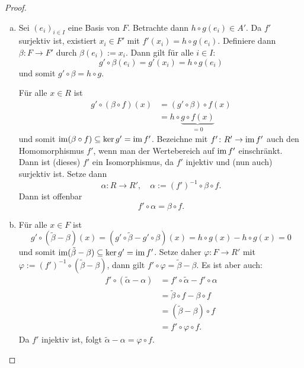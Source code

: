 \begin{proof}
  \begin{enumerate}[(a)]
    \item
      Sei ${(e_i)}_{i \in I}$ eine Basis von $F$.
      Betrachte dann $h \circ g (e_i) \in A'$.
      Da $f'$ surjektiv ist, existiert $x_i \in F'$ mit $f'(x_i) = h \circ g(e_i)$.
      Definiere dann $\beta \colon F \to F'$ durch $\beta(e_i) := x_i$.
      Dann gilt für alle $i \in I$:
      \begin{equation*}
        g' \circ \beta(e_i) = g'(x_i) = h \circ g(e_i)
      \end{equation*}
      und somit $g' \circ \beta = h \circ g$.

      Für alle $x \in R$ ist
      \begin{align*}
        g' \circ (\beta \circ f) (x)
          & = (g' \circ \beta) \circ f (x) \\
          & = h \circ \underset{=0}{\underbrace{g \circ f(x)}}
      \end{align*}
      und somit $\operatorname{im} (\beta \circ f) \subseteq  \ker g' = \operatorname{im} f'$.
      Bezeichne mit $f'\colon R' \to \operatorname{im} f'$ auch den Homomorphismus $f'$, wenn man der Wertebereich auf $\operatorname{im} f'$ einschränkt.
      Dann ist (dieses) $f'$ ein Isomorphismus, da $f'$ injektiv und (nun auch) surjektiv ist.
      Setze dann
      \[
        \alpha \colon R \to R',\quad \alpha := {(f')}^{-1} \circ \beta \circ f.
      \]
      Dann ist offenbar
      \begin{equation*}
        f' \circ \alpha = \beta \circ f.
      \end{equation*}
    \item
      Für  alle $x \in F$ ist
      \begin{equation*}
        g' \circ (\tilde\beta - \beta) (x) = (g' \circ \tilde \beta - g' \circ \beta) (x) = h\circ g(x) - h \circ g(x) = 0
      \end{equation*}
      und somit $\operatorname{im} (\tilde\beta - \beta) \subseteq \ker g' = \operatorname{im} f'$.
      Setze daher $\varphi \colon F \to R'$ mit $\varphi := {(f')}^{-1} \circ (\tilde \beta - \beta)$, dann gilt $f' \circ \varphi = \tilde \beta - \beta$.
      Es ist aber auch:
      \begin{align*}
        f' \circ (\tilde\alpha - \alpha)
          & = f' \circ \tilde \alpha - f' \circ \alpha \\
          & = \tilde \beta \circ f - \beta \circ f \\
          & = (\tilde \beta - \beta) \circ f \\
          & = f' \circ \varphi \circ f.
      \end{align*}
      Da $f'$ injektiv ist, folgt $\tilde \alpha - \alpha = \varphi \circ f$.
  \end{enumerate}
\end{proof}
